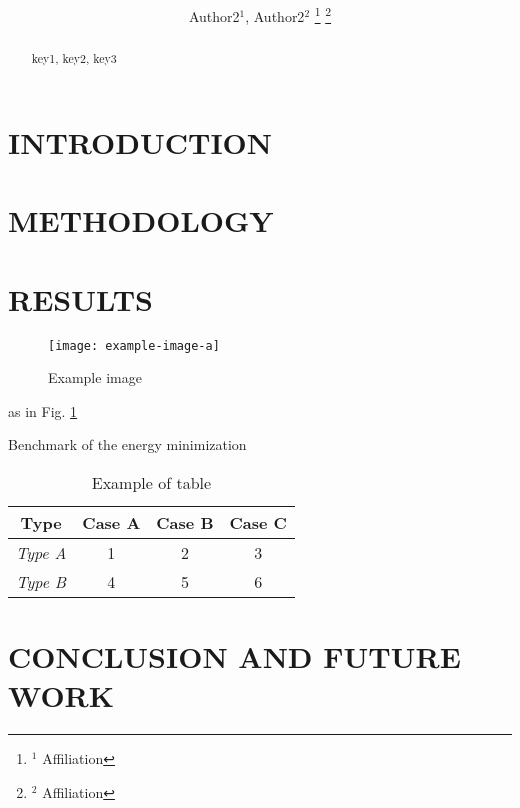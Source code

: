 \documentclass[letterpaper, 10pt, conference]{ieeeconf}
\title{\LARGE \bf \MainTitle}
\author{
    Author2$^{1}$, Author2$^{2}$%
    \thanks{$^{1}$ Affiliation}%
    \thanks{$^{2}$ Affiliation}%
}
\begin{document}
	\maketitle
	\thispagestyle{empty}
	\pagestyle{empty}

	\begin{abstract}
		\begin{keywords}
			key1, key2, key3
		\end{keywords}
		\lipsum[1-1]
		\cite{author2019}
	\end{abstract}

    \section{INTRODUCTION}
		\lipsum[1-3]

    \section{METHODOLOGY}
		\lipsum[1-5] \cite{author2020}

	\section{RESULTS}
		\begin{figure}
			\centering
			\texttt{[image: example-image-a]}
			\caption{Example image}
			\label{image:example}
		\end{figure}
		\lipsum[1-7] as in Fig. \ref{image:example}
		\begin{table}[!tb]
			\caption{Benchmark of the energy minimization}
			\label{table:energy_monoped}
			\begin{center}
				\begin{tabular}{|c|c|c|c|}
					\hline
					\textbf{Type} & \textbf{Case A} & \textbf{Case B} & \textbf{Case C}\\
					\hline \hline
					\textit{Type A} & 1 & 2 & 3 \\
					\hline
					\textit{Type B}  & 4 & 5 & 6 \\
					\hline
				\end{tabular}
				\caption{Example of table}
			\end{center}
		\end{table}

	\section{CONCLUSION AND FUTURE WORK}
		\lipsum[1-2]
\end{document}
